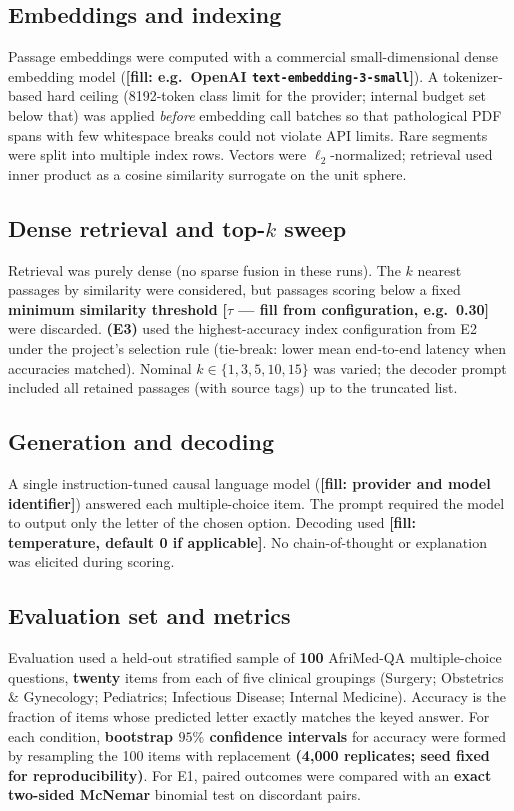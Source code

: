\documentclass[11pt,a4paper]{article}
\begin{document}
\subsection{Embeddings and indexing}
Passage embeddings were computed with a commercial small-dimensional dense embedding model (\textbf{[fill: e.g.\ OpenAI \texttt{text-embedding-3-small}]}). A tokenizer-based hard ceiling (8192-token class limit for the provider; internal budget set below that) was applied \emph{before} embedding call batches so that pathological PDF spans with few whitespace breaks could not violate API limits. Rare segments were split into multiple index rows. Vectors were \(\ell_2\)-normalized; retrieval used inner product as a cosine similarity surrogate on the unit sphere.

\subsection{Dense retrieval and \texorpdfstring{top-\(k\)}{top-k} sweep}
Retrieval was purely dense (no sparse fusion in these runs). The \(k\) nearest passages by similarity were considered, but passages scoring below a fixed \textbf{minimum similarity threshold} \textbf{[\(\tau\) --- fill from configuration, e.g.\ 0.30]} were discarded. \textbf{(E3)} used the highest-accuracy index configuration from E2 under the project's selection rule (tie-break: lower mean end-to-end latency when accuracies matched). Nominal \(k \in \{1,3,5,10,15\}\) was varied; the decoder prompt included all retained passages (with source tags) up to the truncated list.

\subsection{Generation and decoding}
A single instruction-tuned causal language model (\textbf{[fill: provider and model identifier]}) answered each multiple-choice item. The prompt required the model to output only the letter of the chosen option. Decoding used \textbf{[fill: temperature, default 0 if applicable]}. No chain-of-thought or explanation was elicited during scoring.

\subsection{Evaluation set and metrics}
Evaluation used a held-out stratified sample of \textbf{100} AfriMed-QA multiple-choice questions, \textbf{twenty} items from each of five clinical groupings (Surgery; Obstetrics \& Gynecology; Pediatrics; Infectious Disease; Internal Medicine). Accuracy is the fraction of items whose predicted letter exactly matches the keyed answer. For each condition, \textbf{bootstrap \(95\%\) confidence intervals} for accuracy were formed by resampling the 100 items with replacement \textbf{(4{,}000 replicates; seed fixed for reproducibility)}. For E1, paired outcomes were compared with an \textbf{exact two-sided McNemar} binomial test on discordant pairs.
\end{document}
